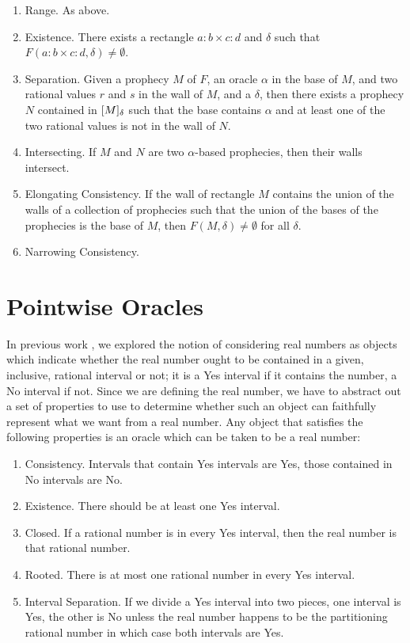\documentclass[12pt]{article}
\begin{document}
\begin{enumerate}
    \item Range. As above.
    \item Existence. There exists a rectangle $a:b \times c:d$ and $\delta$ such that $F(a:b \times c:d, \delta) \neq \emptyset$.
    \item Separation. Given a prophecy $M$ of $F$, an oracle $\alpha$ in the base of $M$, and two rational values $r$ and $s$ in the wall of $M$, and a $\delta$, then there exists a prophecy $N$ contained in $[M]_{\delta}$ such that the base contains $\alpha$ and at least one of the two rational values is not in the wall of $N$.  
    \item Intersecting. If $M$ and $N$ are two $\alpha$-based prophecies, then their walls intersect. 
    \item Elongating Consistency. If the wall of rectangle $M$ contains the union of the walls of a collection of prophecies such that the union of the bases of the prophecies is the base of $M$, then $F(M, \delta) \neq \emptyset$ for all $\delta$.
    \item Narrowing Consistency. 
\end{enumerate}


\section{Pointwise Oracles}

In previous work \cite{taylor23main}, we explored the notion of considering real numbers as objects which indicate whether the real number ought to be contained in a given, inclusive, rational interval or not; it is a Yes interval if it contains the number, a No interval if not. Since we are defining the real number, we have to abstract out a set of properties to use to determine whether such an object can faithfully represent what we want from a real number. Any object that satisfies the following properties is an oracle which can be taken to be a real number:

\begin{enumerate}
    \item Consistency. Intervals that contain Yes intervals are Yes, those contained in No intervals are No. 
    \item Existence. There should be at least one Yes interval. 
    \item Closed. If a rational number is in every Yes interval, then the real number is that rational number. 
    \item Rooted. There is at most one rational number in every Yes interval. 
    \item Interval Separation. If we divide a Yes interval into two pieces, one interval is Yes, the other is No unless the real number happens to be the partitioning rational number in which case both intervals are Yes. 
\end{enumerate}
\end{document}
